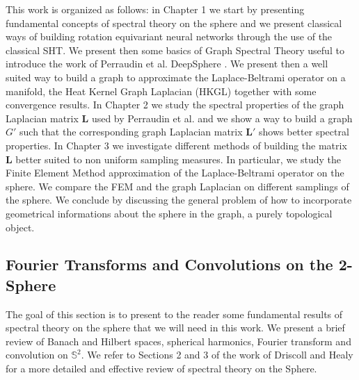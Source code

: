 This work is organized as follows: in Chapter 1 we start by presenting fundamental concepts of spectral theory on the sphere and we present classical ways of building rotation equivariant neural networks through the use of the classical SHT.  We present then some basics of Graph Spectral Theory useful to introduce the work of Perraudin et al. DeepSphere \cite{DeepSphere}. We present then a well suited way to build a graph to approximate the Laplace-Beltrami operator on a manifold, the Heat Kernel Graph Laplacian (HKGL) together with some convergence results. In Chapter 2 we study the spectral properties of the graph Laplacian matrix $\mathbf L$ used by Perraudin et al. and we show a way to build a graph $G'$ such that the corresponding graph Laplacian matrix $\mathbf L'$ shows better spectral properties. In Chapter 3 we investigate different methods of building the matrix $\mathbf L$ better suited to non uniform sampling measures. In particular, we study the Finite Element Method approximation of the Laplace-Beltrami operator on the sphere. We compare the FEM and the graph Laplacian on different samplings of the sphere. We conclude by discussing the general problem of how to incorporate geometrical informations about the sphere in the graph, a purely topological object.

\subsection{Fourier Transforms and Convolutions on the 2-Sphere}\label{sec:Fourier on the Sphere}
The goal of this section is to present to the reader some fundamental results of spectral theory on the sphere that we will need in this work. We present a brief review of Banach and Hilbert spaces, spherical harmonics, Fourier transform and convolution on $\mathbb S^2$. We refer to Sections 2 and 3 of the work of Driscoll and Healy \cite{Driscoll:1994:CFT:184069.184073} for a more detailed and effective review of spectral theory on the Sphere.

